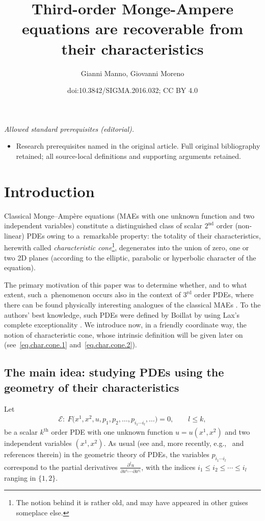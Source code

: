 \documentclass[10pt,a4paper]{amsart}
\title{Third-order Monge-Ampere equations are recoverable from their characteristics}
\author{Gianni Manno, Giovanni Moreno}
\date{doi:10.3842/SIGMA.2016.032; CC BY 4.0}
\newcommand{\E}{\mathcal{E}}
\newcommand{\Th}{^\textrm{th}}
\newcommand{\Rd}{^\textrm{rd}}
\newcommand{\Nd}{^\textrm{nd}}
\numberwithin{equation}{section}
\begin{document}
\maketitle
\noindent\textit{Allowed standard prerequisites (editorial).}\begin{itemize}
\item Research prerequisites named in the original article. Full original bibliography retained; all source-local definitions and supporting arguments retained.
\end{itemize}\medskip
\section{Introduction}

Classical Monge--Amp\`ere equations (MAEs with one unknown function and two independent variables) constitute a distinguished class of scalar
$2\Nd$ order (non-linear) PDEs owing to a~remarkable property: the totality of their characteristics, herewith called
\emph{characteristic cone}\footnote{The notion behind it is rather old, and may have appeared in other
guises someplace else.}, degenerates into the union of zero, one or two 2D planes (according to the elliptic, parabolic or hyperbolic character of the equation).

The primary motivation of this paper was to determine whether, and to what extent, such a~phenomenon occurs also in the context of $3\Rd$ order PDEs, where there can be found physically interesting analogues of the classical MAEs \cite{MR1925763,MR2369200,MR1397274,MR1958112,MR1372461}. To the authors' best knowledge, such PDEs were def\/ined by Boillat by using Lax's complete exceptionality \cite{MR1139843,MR1194520, MR0067317}.
We introduce now, in a friendly coordinate way, the notion of characteristic cone, whose intrinsic def\/inition will be given later on (see~\eqref{eq.char.cone.1} and~\eqref{eq.char.cone.2}).

\subsection*{The main idea: studying PDEs using the geometry of their characteristics}\label{secIntroCarCone}
Let
\begin{gather}\label{equation}
\E\colon \ F\big(x^1,x^2,u,p_1,p_2,\dots,p_{i_1\cdots i_l},\dots\big)=0 , \qquad l \leq k,
\end{gather}
be a scalar
$k\Th$ order PDE with one unknown function $u=u(x^1,x^2)$ and two independent variables $(x^1,x^2)$.
As usual (see \cite{MR1504329} and, more recently, e.g.,~\cite{MR2813504,MR2389645} and references therein)
in the geometric theory of PDEs, the variables $p_{i_1\cdots i_l}$ correspond to the partial derivatives $\frac{\partial^{l}u}{\partial x^{i_1}\cdots\partial x^{i_l}}$, with the indices $ i_1\leq i_2\leq \cdots\leq i_l$ ranging in $ \{1, 2\}$.
\end{document}
